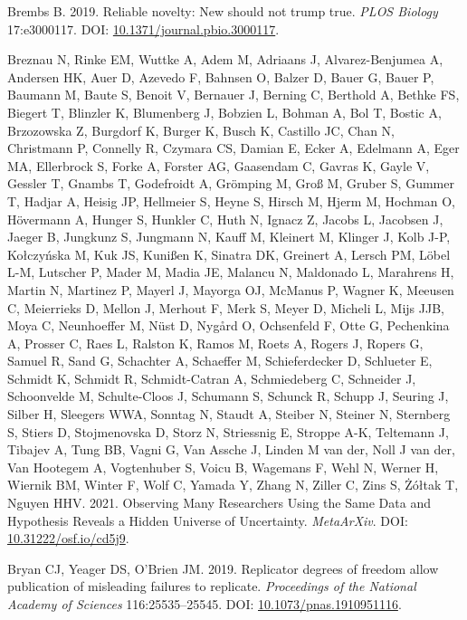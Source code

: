 \documentclass[10pt,a4paper]{article}
\newlength{\cslhangindent}
\newenvironment{CSLReferences}[2] %
 {\begin{list}{}{%
  \setlength{\itemindent}{0pt}
  \setlength{\leftmargin}{0pt}
  \setlength{\parsep}{0pt}
  \ifodd #1
   \setlength{\leftmargin}{\cslhangindent}
   \setlength{\itemindent}{-1\cslhangindent}
  \fi
  \setlength{\itemsep}{#2\baselineskip}}}
 {\end{list}}
\begin{document}
\begin{CSLReferences}{1}{0}
Brembs B. 2019. Reliable novelty: {New} should not trump true. \emph{PLOS Biology} 17:e3000117. DOI: \href{https://doi.org/10.1371/journal.pbio.3000117}{10.1371/journal.pbio.3000117}.

Breznau N, Rinke EM, Wuttke A, Adem M, Adriaans J, Alvarez-Benjumea A, Andersen HK, Auer D, Azevedo F, Bahnsen O, Balzer D, Bauer G, Bauer P, Baumann M, Baute S, Benoit V, Bernauer J, Berning C, Berthold A, Bethke FS, Biegert T, Blinzler K, Blumenberg J, Bobzien L, Bohman A, Bol T, Bostic A, Brzozowska Z, Burgdorf K, Burger K, Busch K, Castillo JC, Chan N, Christmann P, Connelly R, Czymara CS, Damian E, Ecker A, Edelmann A, Eger MA, Ellerbrock S, Forke A, Forster AG, Gaasendam C, Gavras K, Gayle V, Gessler T, Gnambs T, Godefroidt A, Grömping M, Groß M, Gruber S, Gummer T, Hadjar A, Heisig JP, Hellmeier S, Heyne S, Hirsch M, Hjerm M, Hochman O, Hövermann A, Hunger S, Hunkler C, Huth N, Ignacz Z, Jacobs L, Jacobsen J, Jaeger B, Jungkunz S, Jungmann N, Kauff M, Kleinert M, Klinger J, Kolb J-P, Kołczyńska M, Kuk JS, Kunißen K, Sinatra DK, Greinert A, Lersch PM, Löbel L-M, Lutscher P, Mader M, Madia JE, Malancu N, Maldonado L, Marahrens H, Martin N, Martinez P, Mayerl J, Mayorga OJ, McManus P, Wagner K, Meeusen C, Meierrieks D, Mellon J, Merhout F, Merk S, Meyer D, Micheli L, Mijs JJB, Moya C, Neunhoeffer M, Nüst D, Nygård O, Ochsenfeld F, Otte G, Pechenkina A, Prosser C, Raes L, Ralston K, Ramos M, Roets A, Rogers J, Ropers G, Samuel R, Sand G, Schachter A, Schaeffer M, Schieferdecker D, Schlueter E, Schmidt K, Schmidt R, Schmidt-Catran A, Schmiedeberg C, Schneider J, Schoonvelde M, Schulte-Cloos J, Schumann S, Schunck R, Schupp J, Seuring J, Silber H, Sleegers WWA, Sonntag N, Staudt A, Steiber N, Steiner N, Sternberg S, Stiers D, Stojmenovska D, Storz N, Striessnig E, Stroppe A-K, Teltemann J, Tibajev A, Tung BB, Vagni G, Van Assche J, Linden M van der, Noll J van der, Van Hootegem A, Vogtenhuber S, Voicu B, Wagemans F, Wehl N, Werner H, Wiernik BM, Winter F, Wolf C, Yamada Y, Zhang N, Ziller C, Zins S, Żółtak T, Nguyen HHV. 2021. Observing {Many} {Researchers} {Using} the {Same} {Data} and {Hypothesis} {Reveals} a {Hidden} {Universe} of {Uncertainty}. \emph{MetaArXiv}. DOI: \href{https://doi.org/10.31222/osf.io/cd5j9}{10.31222/osf.io/cd5j9}.

Bryan CJ, Yeager DS, O'Brien JM. 2019. Replicator degrees of freedom allow publication of misleading failures to replicate. \emph{Proceedings of the National Academy of Sciences} 116:25535--25545. DOI: \href{https://doi.org/10.1073/pnas.1910951116}{10.1073/pnas.1910951116}.


\end{CSLReferences}
\end{document}
